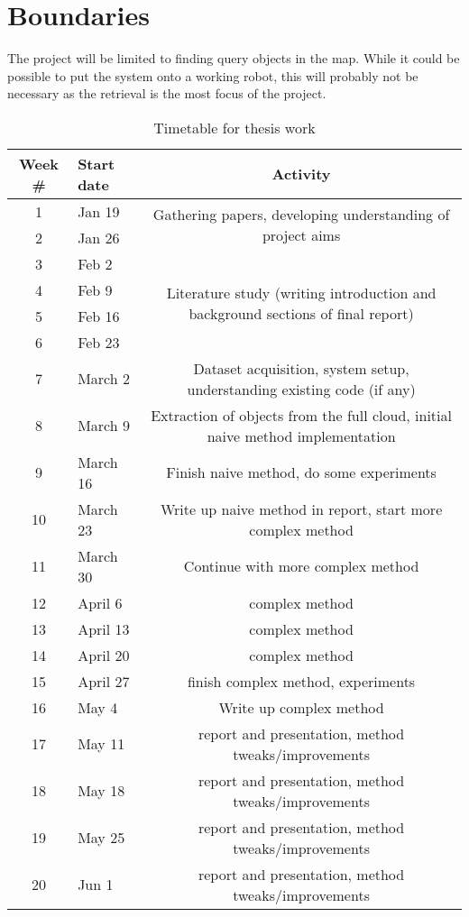 \documentclass[10pt,a4paper]{article}
\begin{document}
\section{Boundaries}
The project will be limited to finding query objects in the map. While it could
be possible to put the system onto a working robot, this will probably not be
necessary as the retrieval is the most focus of the project. 
\begin{table}
  \centering
  \begin{tabular}{c|l|c}
    Week \# & Start date &  Activity \\\hline
    1 & Jan 19 &\multirow{2}{*}{Gathering papers, developing understanding of
      project aims}\\
    2 & Jan 26 &\\\hline
    3 & Feb 2 &\multirow{4}{*}{Literature study (writing introduction and
      background sections of final report)}\\
    4 & Feb 9 &\\
    5 & Feb 16 &\\
    6 & Feb 23 &\\\hline
    7 & March 2 & Dataset acquisition, system setup, understanding existing code
    (if any)\\
    8 & March 9 & Extraction of objects from the full cloud, initial naive
    method implementation\\
    9 & March 16 & Finish naive method, do some experiments\\
    10 & March 23 & Write up naive method in report, start more complex method\\
    11 & March 30 & Continue with more complex method\\\hline
    12 & April 6 & complex method \\
    13 & April 13 & complex method \\
    14 & April 20 & complex method \\
    15 & April 27 & finish complex method, experiments \\
    16 & May 4 & Write up complex method\\\hline
    17 & May 11 & report and presentation, method tweaks/improvements\\
    18 & May 18 & report and presentation, method tweaks/improvements\\
    19 & May 25 & report and presentation, method tweaks/improvements\\
    20 & Jun 1 & report and presentation, method tweaks/improvements\\
  \end{tabular}
  \caption{Timetable for thesis work}
  \label{tab:time}
\end{table}
\printbibliography
\end{document}
